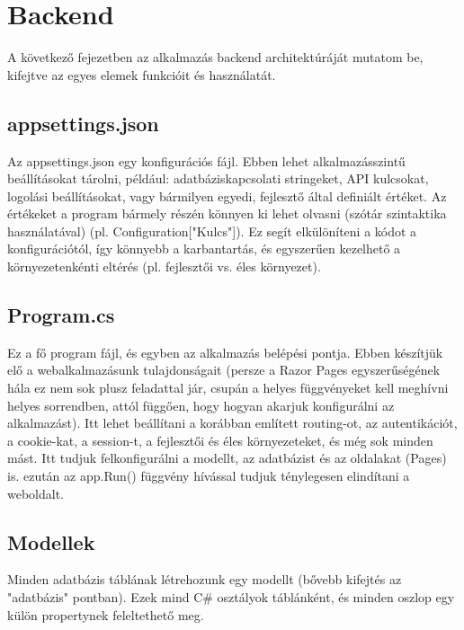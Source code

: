 \section{Backend}

A következő fejezetben az alkalmazás backend architektúráját mutatom be, kifejtve az egyes elemek funkcióit és használatát.

\subsection{appsettings.json}

Az appsettings.json egy konfigurációs
fájl. Ebben lehet alkalmazásszintű beállításokat tárolni, például:
adatbáziskapcsolati stringeket,
API kulcsokat,
logolási beállításokat,
vagy bármilyen egyedi, fejlesztő által definiált értéket.
Az értékeket a program bármely részén könnyen ki lehet olvasni (szótár szintaktika használatával)  (pl. Configuration["Kulcs"]). Ez segít elkülöníteni a kódot a
konfigurációtól, így könnyebb a karbantartás, és egyszerűen kezelhető a környezetenkénti
eltérés (pl. fejlesztői vs. éles környezet).

\subsection{Program.cs}
Ez a fő program fájl, és egyben az alkalmazás belépési pontja. Ebben készítjük
elő a webalkalmazásunk tulajdonságait (persze a Razor Pages egyszerűségének
hála ez nem sok plusz feladattal jár, csupán a helyes függvényeket
kell meghívni helyes sorrendben, attól függően, hogy hogyan
akarjuk konfigurálni az alkalmazást). Itt lehet beállítani a
korábban említett routing-ot, az autentikációt, a cookie-kat,
a session-t, a fejlesztői és éles környezeteket, és még sok minden mást. Itt tudjuk felkonfigurálni a modellt, az adatbázist
és az oldalakat (Pages) is. ezután az app.Run() függvény hívással
tudjuk ténylegesen elindítani a weboldalt.

\subsection{Modellek}
Minden adatbázis táblának létrehozunk egy modellt
(bővebb kifejtés az "adatbázis" pontban). Ezek mind C\# osztályok
táblánként, és minden oszlop egy külön propertynek feleltethető meg.


